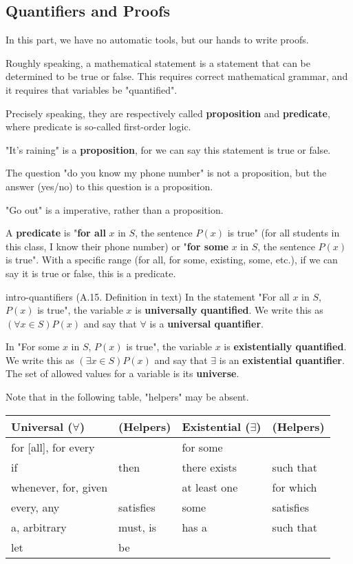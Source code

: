 \documentclass[../src/handouts/main.tex]{subfiles}
\begin{document}
\subsection{Quantifiers and Proofs}

In this part, we have no automatic tools, but our hands to write proofs.

Roughly speaking, a mathematical statement is a statement that can be determined to be true or false.
This requires correct mathematical grammar, and it requires that variables be "quantified".

Precisely speaking, they are respectively called \textbf{proposition} and \textbf{predicate}, where predicate is so-called first-order logic.

"It's raining" is a \textbf{proposition}, for we can say this statement is true or false.

The question "do you know my phone number" is not a proposition, but the answer (yes/no) to this question is a proposition.

"Go out" is a imperative, rather than a proposition.

A \textbf{predicate} is "\textbf{for all} $x$ in $S$, the sentence $P(x)$ is true" (for all students in this class, I know their phone number) or "\textbf{for some} $x$ in $S$, the sentence $P(x)$ is true". With a specific range (for all, for some, existing, some, etc.), if we can say it is true or false, this is a predicate.

\begin{definition}{}{intro-quantifiers}
  (A.15. Definition in text)
  In the statement "For all $x$ in $S$, $P(x)$ is true", the variable $x$ is \textbf{universally quantified}. We write this as $(\forall x \in S) P(x)$ and say that $\forall$ is a \textbf{universal quantifier}.

  In "For some $x$ in $S$, $P(x)$ is true", the variable $x$ is \textbf{existentially quantified}. We write this as $(\exists x \in S) P(x)$ and say that $\exists$ is an \textbf{existential quantifier}. The set of allowed values for a variable is its \textbf{universe}.

  Note that in the following table, "helpers" may be absent.

  \centering
  \begin{tabular}{ll|ll}
    Universal ($\forall$) & (Helpers) & Existential ($\exists$) & (Helpers) \\ \hline
    for [all], for every  &           & for some                &           \\
    if                    & then      & there exists            & such that \\
    whenever, for, given  &           & at least one            & for which \\
    every, any            & satisfies & some                    & satisfies \\
    a, arbitrary          & must, is  & has a                   & such that \\
    let                   & be        &                         &
  \end{tabular}
\end{definition}
\end{document}
